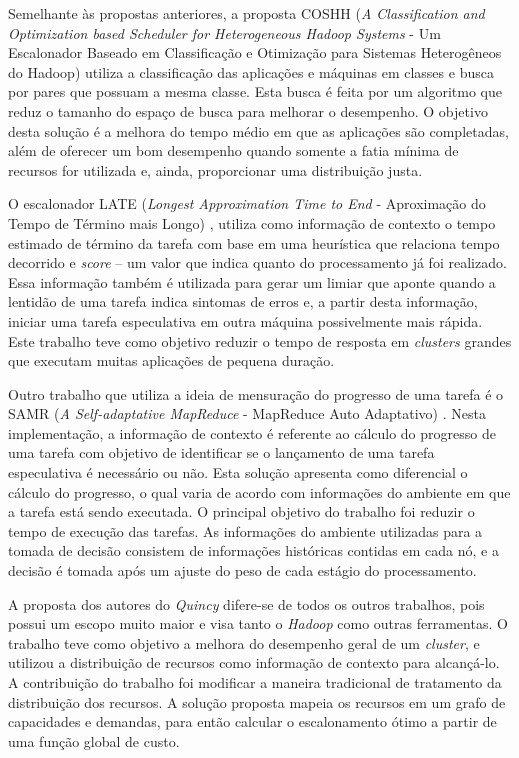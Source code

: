 Semelhante às propostas anteriores, a proposta COSHH (\textit{A Classification and Optimization based Scheduler for Heterogeneous Hadoop Systems} - Um Escalonador Baseado em Classificação e Otimização para Sistemas Heterogêneos do Hadoop) \citet{COSHH} utiliza a classificação das aplicações e máquinas em classes e busca por pares que possuam a mesma classe. Esta busca é feita por um algoritmo que reduz o tamanho do espaço de busca para melhorar o desempenho. O objetivo desta solução é a melhora do tempo médio em que as aplicações são completadas, além de oferecer um bom desempenho quando somente a fatia mínima de recursos for utilizada e, ainda, proporcionar uma distribuição justa.

O escalonador LATE (\textit{Longest Approximation Time to End} - Aproximação do Tempo de Término mais Longo) \citet{LATE}, utiliza como informação de contexto o tempo estimado de término da tarefa com base em uma heurística que relaciona tempo decorrido e \textit{score} -- um valor que indica quanto do processamento já foi realizado. Essa informação também é utilizada para gerar um limiar que aponte quando a lentidão de uma tarefa indica sintomas de erros e, a partir desta informação, iniciar uma tarefa especulativa em outra máquina possivelmente mais rápida. Este trabalho teve como objetivo reduzir o tempo de resposta em \textit{clusters} grandes que executam muitas aplicações de pequena duração.

Outro trabalho que utiliza a ideia de mensuração do progresso de uma tarefa é o SAMR (\textit{A Self-adaptative MapReduce} - MapReduce Auto Adaptativo) \citet{SAMR}. Nesta implementação, a informação de contexto é referente ao cálculo do progresso de uma tarefa com objetivo de identificar se o lançamento de uma tarefa especulativa é necessário ou não. Esta solução apresenta como diferencial o cálculo do progresso, o qual varia de acordo com informações do ambiente em que a tarefa está sendo executada. O principal objetivo do trabalho foi reduzir o tempo de execução das tarefas. As informações do ambiente utilizadas para a tomada de decisão consistem de informações históricas contidas em cada nó, e a decisão é tomada após um ajuste do peso de cada estágio do processamento.


A proposta dos autores do \textit{Quincy} \citet{Quincy} difere-se de todos os outros trabalhos, pois possui um escopo muito maior e visa tanto o \textit{Hadoop} como outras ferramentas. O trabalho teve como objetivo a melhora do desempenho geral de um \textit{cluster}, e utilizou a distribuição de recursos como informação de contexto para alcançá-lo. A contribuição do trabalho foi modificar a maneira tradicional de tratamento da distribuição dos recursos. A solução proposta mapeia os recursos em um grafo de capacidades e demandas, para então calcular o escalonamento ótimo a partir de uma função global de custo.

